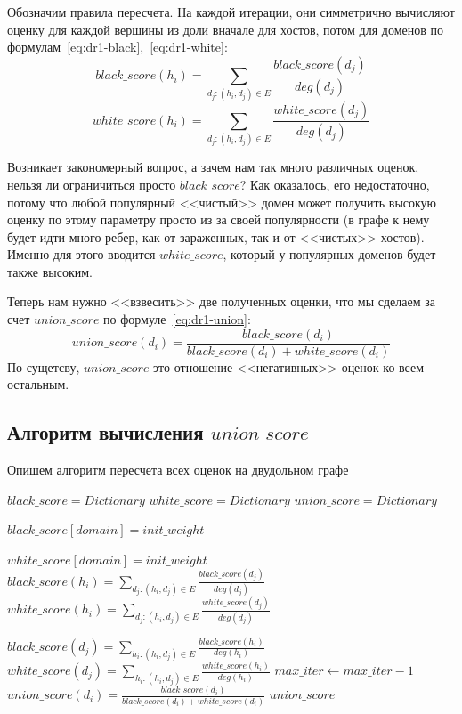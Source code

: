\documentclass[a4paper,14pt]{extreport} %
\begin{document}
Обозначим правила пересчета. На каждой итерации, они симметрично вычисляют оценку для каждой вершины из доли вначале для хостов, потом для доменов по формулам~\ref{eq:dr1-black},~\ref{eq:dr1-white}:
\begin{equation}
	\label{eq:dr1-black}
	black\_score(h_i) = \sum_{d_j: (h_i, d_j)\in E} \frac{black\_score(d_j)}{deg(d_j)}
\end{equation}
\begin{equation}
	\label{eq:dr1-white}
	white\_score(h_i) = \sum_{d_j: (h_i, d_j)\in E} \frac{white\_score(d_j)}{deg(d_j)}
\end{equation}
	
Возникает закономерный вопрос, а зачем нам так много различных оценок, нельзя ли ограничиться просто $black\_score$? Как оказалось, его недостаточно, потому что любой популярный <<чистый>> домен может получить высокую оценку по этому параметру просто из за своей популярности (в графе к нему будет идти много ребер, как от зараженных, так и от <<чистых>> хостов). Именно для этого вводится $white\_score$, который у популярных доменов будет также высоким.
	
Теперь нам нужно <<взвесить>> две полученных оценки, что мы сделаем за счет $union\_score$ по формуле~\ref{eq:dr1-union}:
\begin{equation}
	\label{eq:dr1-union}
	union\_score(d_i) = \frac{black\_score(d_i)}{black\_score(d_i) + white\_score(d_i)}
\end{equation}
По сущетсву, $union\_score$ это отношение <<негативных>> оценок ко всем остальным.

\subsection{Алгоритм вычисления $union\_score$}
\label{alg:us}
Опишем алгоритм пересчета всех оценок на двудольном графе
\begin{algorithmic}
	\State $black\_score = Dictionary$
	\State $white\_score = Dictionary$
	\State $union\_score = Dictionary$
			
			
	\State $black\_score[domain] = init\_weight$
	\EndFor
			
	\State $white\_score[domain] = init\_weight$
	\EndFor
	\State $black\_score(h_i) = \sum_{d_j: (h_i, d_j)\in E} \frac{black\_score(d_j)}{deg(d_j)}$
	\State $white\_score(h_i) = \sum_{d_j: (h_i, d_j)\in E} \frac{white\_score(d_j)}{deg(d_j)}$
	\EndFor
				
	\State $black\_score(d_j) = \sum_{h_i: (h_i, d_j)\in E} \frac{black\_score(h_i)}{deg(h_i)}$
	\State $white\_score(d_j) = \sum_{h_i: (h_i, d_j)\in E} \frac{white\_score(h_i)}{deg(h_i)}$
	\EndFor
	\State $max\_iter\gets max\_iter-1$
	\EndWhile
	\State $union\_score(d_i) = \frac{black\_score(d_i)}{black\_score(d_i) + white\_score(d_i)}$
	\EndFor
	\State \Return $union\_score$
	\EndFunction
\end{algorithmic}
	
\end{document}
